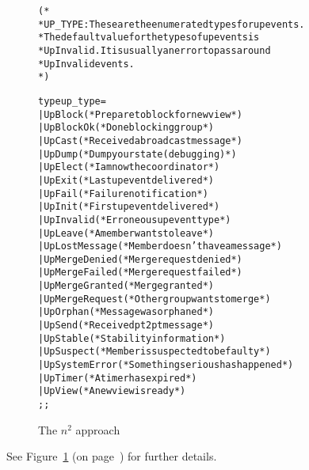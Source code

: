 \documentclass[12pt]{article}
\newenvironment{codebox}{
\begin{alltt}
\sbox{\figurebox}\bgroup
\begin{minipage}{\hsize}
}{
\end{minipage}
\egroup
\fbox{\usebox{\figurebox}}
\end{alltt}
}
\begin{document}
\begin{figure}
\begin{codebox}
(*
 * UP\_TYPE: These are the enumerated types for up events.
 * The default value for the types of up events is
 * UpInvalid.  It is usually an error to pass around
 * UpInvalid events. 
 *)

type up\_type =
 | UpBlock				(* Prepare to block for new view *)
 | UpBlockOk				(* Done blocking group *)
 | UpCast				(* Received a broadcast message *)
 | UpDump				(* Dump your state (debugging) *)
 | UpElect				(* I am now the coordinator *)
 | UpExit				(* Last up event delivered *)
 | UpFail				(* Failure notification *)
 | UpInit				(* First up event delivered *)
 | UpInvalid				(* Erroneous up event type *)
 | UpLeave				(* A member wants to leave *)
 | UpLostMessage			(* Member doesn't have a message *)
 | UpMergeDenied			(* Merge request denied *)
 | UpMergeFailed			(* Merge request failed *)
 | UpMergeGranted			(* Merge granted *)
 | UpMergeRequest			(* Other group wants to merge *)
 | UpOrphan				(* Message was orphaned *)
 | UpSend				(* Received pt2pt message *)
 | UpStable				(* Stability information *)
 | UpSuspect				(* Member is suspected to be faulty *)
 | UpSystemError			(* Something serious has happened *)
 | UpTimer				(* A timer has expired *)
 | UpView				(* A new view is ready *)
;;
\end{codebox}
\caption{The $n^2$ approach}
\label{fig:up_type}
\end{figure}
See Figure~\ref{fig:up_type} (on page~\pageref{fig:up_type}) for
further details.
\end{document}
